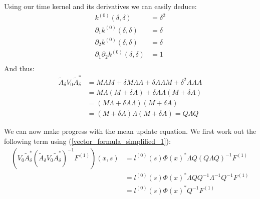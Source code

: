 \documentclass{article}
\theoremstyle{definition}
\theoremstyle{remark}
\theoremstyle{remark}
\begin{document}
\noindent Using our time kernel and its derivatives we can easily deduce:
\begin{align*}
    k^{(0)}(\delta,\delta) &= \delta^2 \\
    \partial_{1}k^{(0)}(\delta,\delta) &= \delta \\
    \partial_{2}k^{(0)}(\delta,\delta) &= \delta \\
    \partial_{1}\partial_{2}k^{(0)}(\delta,\delta) &= 1 \\
\end{align*}
And thus:
\begin{align*}
    \tilde{A}_{\delta}V_{0}\tilde{A}_{\delta}^{*} &= M\Lambda M + \delta M\Lambda A + \delta A\Lambda M +  \delta^{2}A\Lambda A \\
    &= M\Lambda(M+\delta A)+\delta A \Lambda(M+\delta A) \\
    &= (M\Lambda+\delta A \Lambda)(M+\delta A) \\
    &= (M+\delta A)\Lambda(M+\delta A) = Q\Lambda Q
\end{align*}

\noindent We can now make progress with the mean update equation. We first work out the following term using (\ref{vector_formula_simplified_1}):
\begin{align*}
    (V_{0}\tilde{A}_{\delta}^{*}(\tilde{A}_{\delta}V_{0}\tilde{A}_{\delta}^{*})^{-1}F^{(1)})(x,s) &= l^{(0)}(s)\Phi(x)^{*}\Lambda Q (Q\Lambda Q)^{-1}F^{(1)} \\
    &=l^{(0)}(s)\Phi(x)^{*}\Lambda Q Q^{-1}\Lambda^{-1}Q^{-1}F^{(1)} \\
    &=l^{(0)}(s)\Phi(x)^{*}Q^{-1}F^{(1)}
\end{align*}
\end{document}
